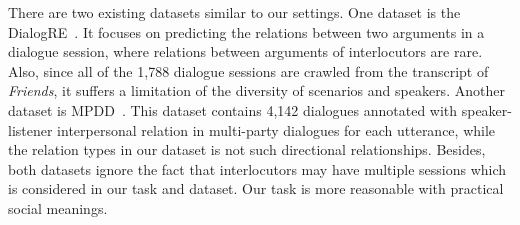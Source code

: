 There are two existing datasets similar to our settings. One dataset is the DialogRE~\cite{YaoYLHLLLHZS19}. It focuses on predicting the relations between two arguments in a dialogue session, where relations between arguments of interlocutors are rare. Also, since all of the 1,788 dialogue sessions are crawled from the transcript of \textit{Friends}, it suffers a limitation of the diversity of scenarios and speakers. Another dataset is MPDD~\cite{ChenHC20}. This dataset contains 4,142 dialogues annotated with speaker-listener interpersonal relation in multi-party dialogues for each utterance, while the relation types in our dataset is not such directional relationships. Besides, both datasets ignore the fact that interlocutors may have multiple sessions which is considered in our task and dataset. Our task is more reasonable with practical social meanings.


